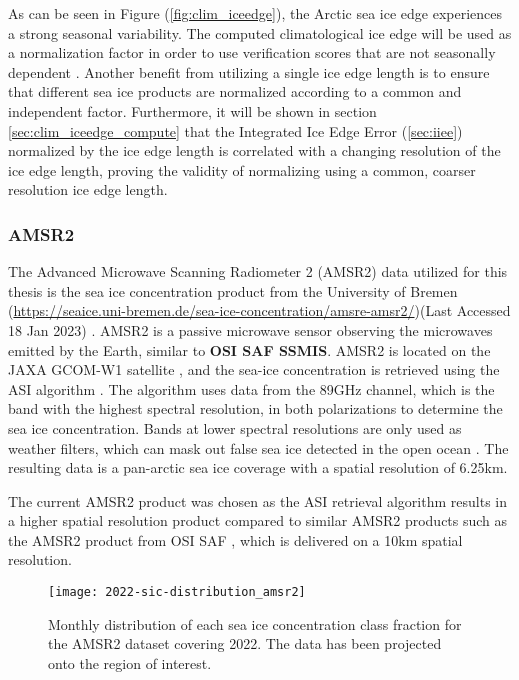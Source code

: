 \documentclass[../main/thesis.tex]{subfiles}
\begin{document}
As can be seen in Figure (\ref{fig:clim_iceedge}), the Arctic sea ice edge experiences a strong seasonal variability. The computed climatological ice edge will be used as a normalization factor in order to use verification scores that are not seasonally dependent \citep{Goessling2016, Zampieri2019, Palerme2019}. Another benefit from utilizing a single ice edge length is to ensure that different sea ice products are normalized according to a common and independent factor. Furthermore, it will be shown in section \ref{sec:clim_iceedge_compute} that the Integrated Ice Edge Error \citep{Goessling2016} (\ref{sec:iiee}) normalized by the ice edge length is correlated with a changing resolution of the ice edge length, proving the validity of normalizing using a common, coarser resolution ice edge length.

\subsubsection{AMSR2}
The Advanced Microwave Scanning Radiometer 2 (AMSR2) data utilized for this thesis is the sea ice concentration product from the University of Bremen (\url{https://seaice.uni-bremen.de/sea-ice-concentration/amsre-amsr2/})(Last Accessed 18 Jan 2023) \citep{Spreen2008}. AMSR2 is a passive microwave sensor observing the microwaves emitted by the Earth, similar to \textbf{OSI SAF SSMIS}. AMSR2 is located on the JAXA GCOM-W1 satellite \cite{Melsheimer2019}, and the sea-ice concentration is retrieved using the ASI algorithm \cite{Spreen2008}. The algorithm uses data from the 89GHz channel, which is the band with the highest spectral resolution, in both polarizations to determine the sea ice concentration. Bands at lower spectral resolutions are only used as weather filters, which can mask out false sea ice detected in the open ocean \cite{Spreen2008}. The resulting data is a pan-arctic sea ice coverage with a spatial resolution of 6.25km.

The current AMSR2 product was chosen as the ASI retrieval algorithm \citep{Spreen2008} results in a higher spatial resolution product compared to similar AMSR2 products such as the AMSR2 product from OSI SAF \citep{Lavelle2016}, which is delivered on a 10km spatial resolution.

\begin{figure}
    \centering
    \texttt{[image: 2022-sic-distribution\_amsr2]}
    \caption{\label{fig:dist-amsr2}Monthly distribution of each sea ice concentration class fraction for the AMSR2 dataset covering 2022. The data has been projected onto the region of interest.}
\end{figure}
\end{document}
